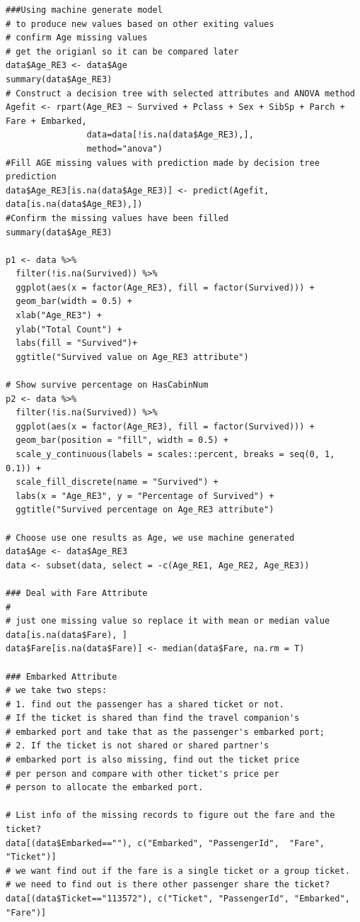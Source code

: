 \documentclass[
]{book}
\begin{document}
\begin{verbatim}
###Using machine generate model
# to produce new values based on other exiting values
# confirm Age missing values
# get the origianl so it can be compared later
data$Age_RE3 <- data$Age
summary(data$Age_RE3)
# Construct a decision tree with selected attributes and ANOVA method
Agefit <- rpart(Age_RE3 ~ Survived + Pclass + Sex + SibSp + Parch + Fare + Embarked,
                data=data[!is.na(data$Age_RE3),],
                method="anova")
#Fill AGE missing values with prediction made by decision tree prediction
data$Age_RE3[is.na(data$Age_RE3)] <- predict(Agefit, data[is.na(data$Age_RE3),])
#Confirm the missing values have been filled
summary(data$Age_RE3)

p1 <- data %>%
  filter(!is.na(Survived)) %>%
  ggplot(aes(x = factor(Age_RE3), fill = factor(Survived))) +
  geom_bar(width = 0.5) +
  xlab("Age_RE3") +
  ylab("Total Count") +
  labs(fill = "Survived")+
  ggtitle("Survived value on Age_RE3 attribute")

# Show survive percentage on HasCabinNum
p2 <- data %>%
  filter(!is.na(Survived)) %>%
  ggplot(aes(x = factor(Age_RE3), fill = factor(Survived))) +
  geom_bar(position = "fill", width = 0.5) +
  scale_y_continuous(labels = scales::percent, breaks = seq(0, 1, 0.1)) +
  scale_fill_discrete(name = "Survived") +
  labs(x = "Age_RE3", y = "Percentage of Survived") +
  ggtitle("Survived percentage on Age_RE3 attribute")

# Choose use one results as Age, we use machine generated
data$Age <- data$Age_RE3
data <- subset(data, select = -c(Age_RE1, Age_RE2, Age_RE3))

### Deal with Fare Attribute
#
# just one missing value so replace it with mean or median value
data[is.na(data$Fare), ]
data$Fare[is.na(data$Fare)] <- median(data$Fare, na.rm = T)

### Embarked Attribute
# we take two steps:
# 1. find out the passenger has a shared ticket or not.
# If the ticket is shared than find the travel companion's
# embarked port and take that as the passenger's embarked port;
# 2. If the ticket is not shared or shared partner's
# embarked port is also missing, find out the ticket price
# per person and compare with other ticket's price per
# person to allocate the embarked port.

# List info of the missing records to figure out the fare and the ticket?
data[(data$Embarked==""), c("Embarked", "PassengerId",  "Fare", "Ticket")]
# we want find out if the fare is a single ticket or a group ticket.
# we need to find out is there other passenger share the ticket?
data[(data$Ticket=="113572"), c("Ticket", "PassengerId", "Embarked", "Fare")]


\end{verbatim}
\end{document}
